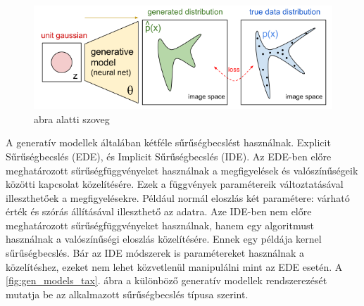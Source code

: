 \begin{figure}[ht]
	\centering
	\includegraphics[width=1\columnwidth]{figures/generative_model_math.png}
	\caption{abra alatti szoveg}
	\label{fig:data_distribution}
\end{figure}


A generatív modellek általában kétféle sűrűségbecslést használnak. Explicit Sűrűségbecslés (EDE), és Implicit Sűrűségbecslés (IDE). Az EDE-ben előre meghatározott sűrűségfüggvényeket használnak a megfigyelések és valószínűségeik közötti kapcsolat közelítésére. Ezek a függvények paramétereik változtatásával illeszthetőek a megfigyelésekre. Például normál eloszlás két paramétere: várható érték és szórás állításával illeszthető az adatra. Aze IDE-ben nem előre meghatározott sűrűségfüggvényeket használnak, hanem egy algoritmust használnak a valószínűségi eloszlás közelítésére. Ennek egy példája kernel sűrűségbecslés. Bár az IDE módszerek is paramétereket használnak a közelítéshez, ezeket nem lehet közvetlenül manipulálni mint az EDE esetén. A \ref{fig:gen_models_tax}. ábra a különböző generatív modellek rendszerezését mutatja be az alkalmazott sűrűségbecslés típusa szerint.


